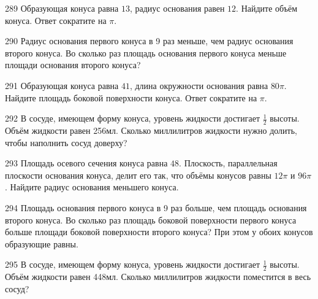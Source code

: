 \documentclass[a4paper]{article}
\begin{document}
\begin{taskBN}{289}
Образующая конуса равна $13$, радиус основания равен $12$. Найдите объём конуса. Ответ сократите на $\pi$.
\end{taskBN}

\begin{taskBN}{290}
Радиус основания первого конуса в 9 раз меньше, чем радиус основания второго конуса. Во сколько раз площадь основания первого конуса меньше площади основания второго конуса?
\end{taskBN}

\begin{taskBN}{291}
Образующая конуса равна $41$, длина окружности основания равна $80\pi$. Найдите площадь боковой поверхности конуса. Ответ сократите на $\pi$.
\end{taskBN}

\begin{taskBN}{292}
В сосуде, имеющем форму конуса, уровень жидкости достигает $\frac{1}{2}$ высоты. Объём жидкости равен 256мл. Сколько миллилитров жидкости нужно долить, чтобы наполнить сосуд доверху?
\end{taskBN}

\begin{taskBN}{293}
Площадь осевого сечения конуса равна $48$. Плоскость, параллельная плоскости основания конуса,  делит его так, что объёмы конусов равны $12\pi$ и $96\pi$. Найдите радиус основания меньшего конуса. 
\end{taskBN}

\begin{taskBN}{294}
Площадь основания первого конуса в 9 раз больше, чем площадь основания второго конуса. Во сколько раз площадь боковой поверхности первого конуса больше площади боковой поверхности второго конуса? При этом у обоих конусов образующие равны.
\end{taskBN}

\begin{taskBN}{295}
В сосуде, имеющем форму конуса, уровень жидкости достигает $\frac{1}{2}$ высоты. Объём жидкости равен 448мл. Сколько миллилитров жидкости поместится в весь сосуд?
\end{taskBN}
\end{document}
